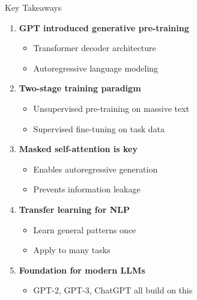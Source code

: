 \documentclass[aspectratio=169]{beamer}
\begin{document}
\begin{frame}[shrink=10]{Key Takeaways 🔑}
    \begin{enumerate}\setlength{\itemsep}{0pt}
        \item \textbf{GPT introduced generative pre-training}
        \begin{itemize}\setlength{\itemsep}{0pt}
            \item Transformer decoder architecture
            \item Autoregressive language modeling
        \end{itemize}

        \vspace{0.3cm}

        \item \textbf{Two-stage training paradigm}
        \begin{itemize}\setlength{\itemsep}{0pt}
            \item Unsupervised pre-training on massive text
            \item Supervised fine-tuning on task data
        \end{itemize}

        \vspace{0.3cm}

        \item \textbf{Masked self-attention is key}
        \begin{itemize}\setlength{\itemsep}{0pt}
            \item Enables autoregressive generation
            \item Prevents information leakage
        \end{itemize}

        \vspace{0.3cm}

        \item \textbf{Transfer learning for NLP}
        \begin{itemize}\setlength{\itemsep}{0pt}
            \item Learn general patterns once
            \item Apply to many tasks
        \end{itemize}

        \vspace{0.3cm}

        \item \textbf{Foundation for modern LLMs}
        \begin{itemize}\setlength{\itemsep}{0pt}
            \item GPT-2, GPT-3, ChatGPT all build on this
        \end{itemize}
    \end{enumerate}
\end{frame}
\end{document}
